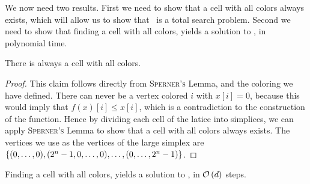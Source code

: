 We now need two results. First we need to show that a cell with all colors always exists, which will allow us to show that \Tarskistar\ is a total search problem. Second we need to show that finding a cell with all colors, yields a solution to \Tarskistar, in polynomial time.

\begin{claim}
    There is always a cell with all colors.
\end{claim}
\begin{proof}
    This claim follows directly from \textsc{Sperner's} Lemma, and the coloring we have defined. There can never be a vertex colored $i$ with $x[i] = 0$, because this would imply that $f(x)[i] \leq x[i]$, which is a contradiction to the construction of the function. Hence by dividing each cell of the latice into simplices, we can apply \textsc{Sperner's} Lemma to show that a cell with all colors always exists. The vertices we use as the vertices of the large simplex are $\left\{(0, \dots, 0), (2^n - 1, 0, \dots, 0), \dots, (0, \dots, 2^n - 1)\right\}$.
\end{proof}
\begin{claim}
    Finding a cell with all colors, yields a solution to \Tarskistar, in $\mathcal{O}\left(d\right)$ steps.
\end{claim}
